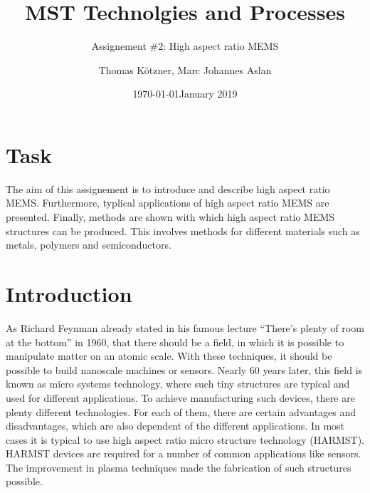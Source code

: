\documentclass[a4paper,
  twoside, %
  headlines=2.1 %
  ]{scrartcl}
\author{\yourname}
\title{\lecture}
\title{MST Technolgies and Processes}
\subtitle{Assignement \#2: High aspect ratio MEMS}
\date{\today}
\author{Thomas Kötzner, Marc Johannes Aslan}
\date{January 2019}
\begin{document}
\maketitle

\section{Task}
The aim of this assignement is to introduce and describe high aspect ratio MEMS. Furthermore, typlical applications of high aspect ratio MEMS are presented. Finally, methods are shown with which high aspect ratio MEMS structures can be produced. This involves methods for different materials such as metals, polymers and semiconductors.

\section{Introduction}
As Richard Feynman already stated in his famous lecture \enquote{There's plenty of room at the bottom} in 1960, that there should be a field, in which it is possible to manipulate matter on an atomic scale. \cite{feynman2012} With these techniques, it should be possible to build nanoscale machines or sensors. Nearly 60 years later, this field is known as micro systems technology, where such tiny structures are typical and used for different applications. To achieve manufacturing such devices, there are plenty different technologies. For each of them, there are certain advantages and disadvantages, which are also dependent of the different applications. In most cases it is typical to use high aspect ratio micro structure technology (HARMST). HARMST devices are required for a number of common applications like sensors. The improvement in plasma techniques made the fabrication of such structures possible. 
\end{document}
